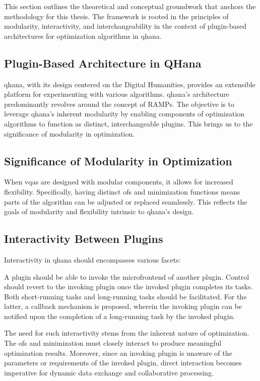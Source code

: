 \documentclass[
  a4paper,  %
  twoside,  %
  bibliography=totoc,
  headsepline,
  cleardoublepage=empty,
  parskip=half,
  draft=false
]{scrbook}
\begin{document}
This section outlines the theoretical and conceptual groundwork that anchors the methodology for this thesis.
The framework is rooted in the principles of modularity, interactivity, and interchangeability in the context of plugin-based architectures for optimization algorithms in \gls{qhana}.

\subsection{Plugin-Based Architecture in QHana}
\gls{qhana}, with its design centered on the Digital Humanities, provides an extensible platform for experimenting with various algorithms.
\gls{qhana}'s architecture predominantly revolves around the concept of RAMPs.
The objective is to leverage \gls{qhana}'s inherent modularity by enabling components of optimization algorithms to function as distinct, interchangeable plugins.
This brings us to the significance of modularity in optimization.

\subsection{Significance of Modularity in Optimization}
When \glspl{vqa} are designed with modular components, it allows for increased flexibility.
Specifically, having distinct \glspl{of} and minimization functions means parts of the algorithm can be adjusted or replaced seamlessly.
This reflects the goals of modularity and flexibility intrinsic to \gls{qhana}'s design.

\subsection{Interactivity Between Plugins}
Interactivity in \gls{qhana} should encompasses various facets:

A plugin should be able to invoke the microfrontend of another plugin.
Control should revert to the invoking plugin once the invoked plugin completes its tasks.
Both short-running tasks and long-running tasks should be facilitated.
For the latter, a callback mechanism is proposed, wherein the invoking plugin can be notified upon the completion of a long-running task by the invoked plugin.

The need for such interactivity stems from the inherent nature of optimization.
The \glspl{of} and minimization must closely interact to produce meaningful optimization results.
Moreover, since an invoking plugin is unaware of the parameters or requirements of the invoked plugin, direct interaction becomes imperative for dynamic data exchange and collaborative processing.
\end{document}
